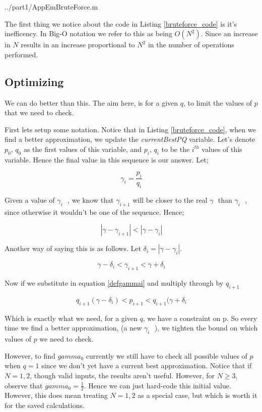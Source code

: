 \documentclass[10pt]{report}
\newcommand*{\gam}{$\gamma \text{ }$}
\newcommand*{\gami}{$\gamma_{i} \text{ }$}
\begin{document}
   {../part1/AppEmBruteForce.m}

The first thing we notice about the code in Listing \ref{bruteforce_code} is it's inefficency. In Big-O notation we refer to this as being $O(N^2)$. Since an increase in $N$ results in an increase proportional to $N^2$ in the number of operations performed.

\subsection{Optimizing}
We can do better than this. The aim here, is for a given $q$, to limit the values of $p$ that we need to check. 

First lets setup some notation. Notice that in Listing \ref{bruteforce_code}, when we find a better approximation, we update the \emph{currentBestPQ} variable. Let's denote $p_0$, $q_0$  as the first values of this variable, and $p_i$, $q_i$ to be the $i^{th}$ values of this variable. Hence the final value in this sequence is our answer. Let;

\begin{equation} \label{defgammai}
  \gamma_i = \frac{p_i}{q_i} 
\end{equation}


Given a value of \gami, we know that $\gamma_{i+1}$ will be closer to the real \gam than \gami, since otherwise it wouldn't be one of the sequence. Hence;

$$ |\gamma- \gamma_{i+1}| < |\gamma - \gamma_{i}| $$

Another way of saying this is as follows. Let $\delta_{i} = | \gamma - \gamma_i  |$. 

$$ \gamma - \delta_i < \gamma_{i+1} < \gamma + \delta_i $$

Now if we substitute in equation \ref{defgammai} and multiply through by $q_{i+1}$

\begin{equation} \label{em_constraint}
q_{i+1} (\gamma - \delta_i) < p_{i+1} < q_{i+1} ( \gamma + \delta_i 
\end{equation} 

Which is exactly what we need, for a given $q$, we have a constraint on p. So every time we find a better approximation, (a new \gami), we tighten the bound on which values of $p$ we need to check.

However, to find $gamma_0$ currently we still have to check all possible values of $p$ when $q = 1$ since we don't yet have a current best approximation. Notice that if $N = 1,2$, though valid inputs, the results aren't useful. However, for $N \geq 3$, observe that $gamma_0 = \frac{1}{2}$. Hence we can just hard-code this initial value. However, this does mean treating $N = 1,2$ as a special case, but which is worth it for the saved calculations.
\end{document}

